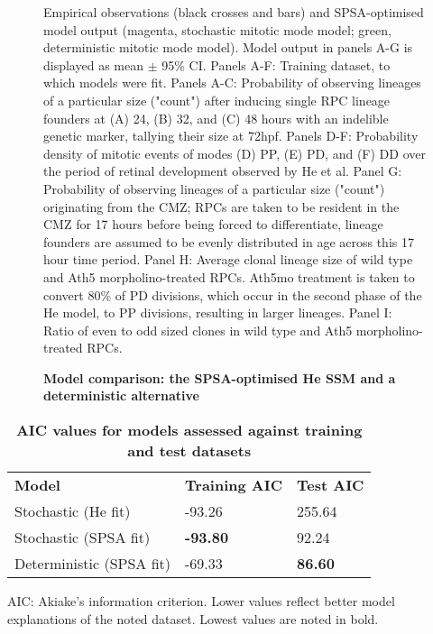 \documentclass[10pt,letterpaper]{article}
\newlength\savedwidth
\newcommand\thickhline{\noalign{\global\savedwidth\arrayrulewidth\global\arrayrulewidth 2pt}%
\hline
\noalign{\global\arrayrulewidth\savedwidth}}
\begin{document}
\begin{figure}[!h]
\caption{{\bf Model comparison: the SPSA-optimised He SSM and a deterministic alternative}}
Empirical observations (black crosses and bars) and SPSA-optimised model output (magenta, stochastic mitotic mode model; green, deterministic mitotic mode model). Model output in panels A-G is displayed as mean $\pm$ 95\% CI. Panels A-F: Training dataset, to which models were fit. Panels A-C: Probability of observing lineages of a particular size ("count") after inducing single RPC lineage founders at (A) 24, (B) 32, and (C) 48 hours with an indelible genetic marker, tallying their size at 72hpf. Panels D-F: Probability density of mitotic events of modes (D) PP, (E) PD, and (F) DD over the period of retinal development observed by He et al. Panel G: Probability of observing lineages of a particular size ("count") originating from the CMZ; RPCs are taken to be resident in the CMZ for 17 hours before being forced to differentiate, lineage founders are assumed to be evenly distributed in age across this 17 hour time period. Panel H: Average clonal lineage size of wild type and Ath5 morpholino-treated RPCs. Ath5mo treatment is taken to convert 80\% of PD divisions, which occur in the second phase of the He model, to PP divisions, resulting in larger lineages. Panel I: Ratio of even to odd sized clones in wild type and Ath5 morpholino-treated RPCs.
\label{SDFig}
\end{figure}

\begin{table}[!ht]
\begin{adjustwidth}{-2.25in}{0in} %
\centering
\caption{
{\bf AIC values for models assessed against training and test datasets}}
\begin{tabular}{|l|l|l|}
\hline
{\bf Model} & {\bf Training AIC} & {\bf Test AIC} \\ \thickhline
Stochastic (He fit) & -93.26 & 255.64\\ \hline
Stochastic (SPSA fit) & {\bf -93.80} & 92.24\\ \hline
Deterministic (SPSA fit) & -69.33 & {\bf 86.60}\\ \hline
\end{tabular}
\begin{flushleft} AIC: Akiake's information criterion. Lower values reflect better model explanations of the noted dataset. Lowest values are noted in bold.
\end{flushleft}
\label{AICtable}
\end{adjustwidth}
\end{table}
\end{document}
